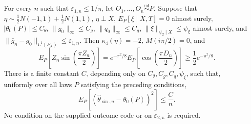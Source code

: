 For every \(n\) such that \(\varepsilon_{1,n}\le 1/\pi\), let \(O_1,\ldots,O_n\stackrel{\mathrm{iid}}{\sim}P\). Suppose that \(\eta\sim\tfrac12N(-1,1)+\tfrac12N(1,1)\), \(\eta\perp X\), \(E_P[\xi\mid X,T]=0\) almost surely, \(|\theta_0(P)|\le C_{\theta}\), \(\|g_0\|_{\infty}\le C_g\), \(\|q_0\|_{\infty}\le C_q\), \(\|\xi\|_{\psi_2\mid X}\le\psi_{\xi}\) almost surely, and \(\|\bar g_n-g_0\|_{L^1(P_X)}\le\varepsilon_{1,n}\). Then \(\kappa_4(\eta)=-2\), \(M(i\pi/2)=0\), and
\[
E_P\!\left[Z_n\sin\!\left(\frac{\pi Z_n}{2}\right)\right]
=e^{-\pi^2/8}E_P\!\left[\cos\!\left(\frac{\pi D_n}{2}\right)\right]
\ge \frac12e^{-\pi^2/8}.
\]
There is a finite constant \(C\), depending only on \(C_{\theta},C_g,C_q,\psi_{\xi}\), such that, uniformly over all laws \(P\) satisfying the preceding conditions,
\[
E_P\!\left[(\widehat\theta_{\sin,n}-\theta_0(P))^2\right]\le \frac{C}{n}.
\]
No condition on the supplied outcome code or on \(\varepsilon_{2,n}\) is required.